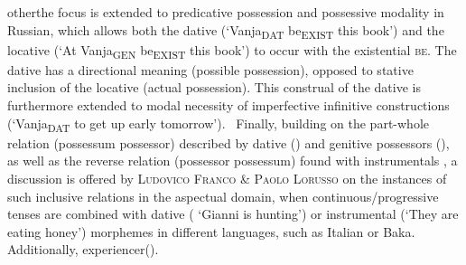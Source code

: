 \begin{styleBodyA}
otherthe focus is extended to predicative possession and possessive modality in Russian, which allows both the dative (‘Vanja\textsc{\textsubscript{DAT}} be\textsc{\textsubscript{EXIST}} this book’) and the locative (‘At Vanja\textsubscript{GEN} be\textsubscript{EXIST} this book’) to occur with the existential \textsc{be}. The dative has a directional meaning (possible possession), opposed to stative inclusion of the locative (actual possession). This construal of the dative is furthermore extended to modal necessity of imperfective infinitive constructions (‘Vanja\textsubscript{DAT} to get up early tomorrow’). \ Finally, building on the part-whole relation (possessum \textstyleNone{${\subseteq}$} possessor) described by dative () and genitive possessors (), as well as the reverse relation (possessor \textstyleNone{${\supseteq}$} possessum) found with instrumentals , a discussion is offered by \textsc{Ludovico Franco \& Paolo Lorusso} on the instances of such inclusive relations in the aspectual domain, when continuous/progressive tenses are combined with dative ( ‘Gianni is hunting’) or instrumental (‘They are eating honey’) morphemes in different languages, such as Italian or Baka. Additionally, experiencer().
\end{styleBodyA}


